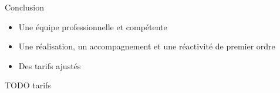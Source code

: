 \ZacSpeak
\begin{frame}{Conclusion}
	\begin{itemize}
		\item Une équipe professionnelle et compétente
		\item Une réalisation, un accompagnement et une réactivité de premier ordre
		\item Des tarifs ajustés
	\end{itemize}
	TODO tarifs
\end{frame}
